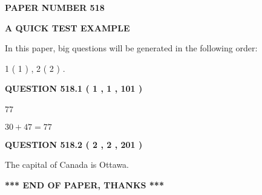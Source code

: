 \documentclass[12pt]{article}
\begin{document}
   
   
   
 {\textbf{ \Large{ PAPER NUMBER  518  }}}
   
   
\vspace{0.2in}
   
   
   
   
   
   
 \vspace{0.2in}
{\LARGE {\textbf{ A QUICK TEST EXAMPLE}}}
   
   
   
\vspace{0.2in}
   
In this paper, big questions will be generated in the following order: 
   
   
   1 ( 1 )
 ,
   2 ( 2 )
 .
  
\vspace{0.2in}
  
{\textbf{\Large{QUESTION
518.1 
 ( 1 , 1 , 101 )
}}}
  
  
 
 
\noindent{}

77
 
 
 
 
\noindent{}

$ %
30 +  %
47=   %
77$
 
 
  
\vspace{0.2in}
  
{\textbf{\Large{QUESTION
518.2 
 ( 2 , 2 , 201 )
}}}
  
  
 
 
\noindent{}
 
 
The capital of Canada is Ottawa.
 
 
 
 
   
   
 \vspace{0.2in}
 
   
   
   
   
\vspace{1.0in} 
{\textbf{\large{ *** END OF PAPER, THANKS *** }}} 
   
\end{document}
